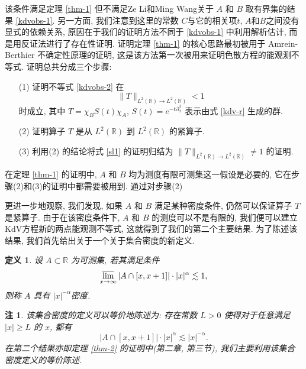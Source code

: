 \documentclass[master]{cugthesis}
\newcommand\R{\ensuremath{\mathbb{R}}}
\newtheorem{remark}{注}
\newtheorem{definition}{定义}[chapter]
\begin{document}
 该条件满足定理 \ref{thm-1} 但不满足Ze Li和Ming Wang关于 $A$ 和 $B$ 取有界集的结果 \eqref{kdvobs-1}.
    另一方面, 我们注意到这里的常数 $C$与它的相关项$t$, $A$和$B$之间没有显式的依赖关系, 原因在于我们的证明方法不同于 \eqref{kdvobs-1} 中利用解析估计, 而是用反证法进行了存在性证明. 证明定理 \ref{thm-1} 的核心思路最初\cite{Amrein1977OnSP}被用于 Amrein-Berthier 不确定性原理的证明, 这是该方法第一次被用来证明色散方程的能观测不等式. 证明总共分成三个步骤:
    \begin{enumerate}
        \item[(1)] 证明不等式 \eqref{kdvobs-2} 在
        \begin{equation}
            \|T\|_{L^{2}(\R)\to L^2(\R)}<1\label{sl1}
        \end{equation}
        时成立, 其中 $T=\chi_BS(t)\chi_A$, $S(t)=e^{-t\partial_x^3}$ 表示由式 \eqref{kdv-r} 生成的群.
        \item[(2)] 证明算子 $T$ 是从 $L^2(\R)$ 到 $L^2(\R)$ 的紧算子.
        \item[(3)] 利用(2) 的结论将式 \eqref{sl1} 的证明归结为 $\| T\|_{L^2(\R)\to L^2(\R)}\neq 1$ 的证明.
    \end{enumerate}
    
    在定理 \ref{thm-1} 的证明中, $A$ 和 $B$ 均为测度有限可测集这一假设是必要的, 它在步骤(2)和(3)的证明中都需要被用到. 通过对步骤(2) 
    
    更进一步地观察, 我们发现, 如果 $A$ 和 $B$ 满足某种密度条件, 仍然可以保证算子 $T$ 是紧算子. 由于在该密度条件下, $A$ 和 $B$ 的测度可以不是有限的, 我们便可以建立KdV方程新的两点能观测不等式, 这就得到了我们的第二个主要结果. 为了陈述该结果, 我们首先给出关于一个关于集合密度的新定义.
    \begin{definition}\label{def-1}
    设 $A\subset \R$ 为可测集, 若其满足条件
    \begin{equation*}
         \varlimsup_{x\to \infty}|A\cap[x,x+1]|\cdot|x|^{\alpha}\lesssim 1,
    \end{equation*}
    则称 $A$ 具有 $|x|^{-\alpha}$密度.
    \end{definition}
    \begin{remark}\label{rem-1}
    该集合密度的定义可以等价地陈述为: 存在常数 $L>0$ 使得对于任意满足 $|x|\ge L$ 的 $x$, 都有
    \begin{equation*}
        |A\cap [x,x+1]|\cdot |x|^\alpha\lesssim |x|^{-\alpha}.
     \end{equation*}
    在第二个结果亦即定理 \ref{thm-2} 的证明中(第二章, 第三节), 我们主要利用该集合密度定义的等价陈述.
    \end{remark}
    
\end{document}
